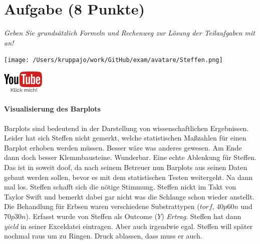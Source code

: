 \documentclass[a4paper, 9pt]{scrartcl}\usepackage[]{graphicx}\usepackage[]{xcolor}
\begin{document}
\section{Aufgabe \hfill (8 Punkte)}

\textit{Geben Sie grundsätzlich Formeln und Rechenweg zur Lösung der Teilaufgaben mit an!} \\[1Ex]
 

 
\begin{minipage}[t]{0.5\textwidth}
\texttt{[image: /Users/kruppajo/work/GitHub/exam/avatare/Steffen.png]}
\end{minipage}
\begin{minipage}[t]{0.5\textwidth}
\hfill
\href{https://youtu.be/vXnLttRL_VI}{\includegraphics[width = 2cm]{img/youtube}}
\end{minipage}
\vspace{-3ex}



\paragraph{Visualisierung des Barplots}


Barplots sind bedeutend in der Darstellung von wissenschaftlichen Ergebnissen. Leider hat sich Steffen nicht gemerkt, welche statistischen Maßzahlen für einen Barplot erhoben werden müssen. Besser wäre was anderes gewesen. Am Ende dann doch besser Klemmbausteine. Wunderbar. Eine echte Ablenkung für Steffen. Das ist in soweit doof, da nach seinem Betreuer nun Barplots aus seinen Daten gebaut werden sollen, bevor es mit dem statistischen Testen weitergeht. Na dann mal los. Steffen schafft sich die nötige Stimmung. Steffen nickt im Takt von Taylor Swift und bemerkt dabei gar nicht was die Schlange schon wieder anstellt. Die Behandlung für Erbsen waren verschiedene Substrattypen ($torf$, $40p60n$ und $70p30n$). Erfasst wurde von Steffen als Outcome ($Y$) \textit{Ertrag}. Steffen hat dann \textit{yield} in seiner Exceldatei eintragen. Aber auch irgendwie egal. Steffen will später nochmal raus um zu Ringen. Druck ablassen, dass muss er auch.
\end{document}
